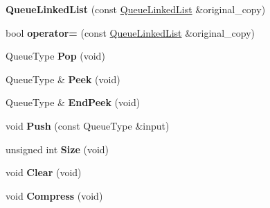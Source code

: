 \begin{DoxyCompactItemize}
\item 
\hypertarget{class_data_structures_1_1_queue_linked_list_a7dc481de74ba21884e1d7a724ecf226d}{{\bfseries Queue\-Linked\-List} (const \hyperlink{class_data_structures_1_1_queue_linked_list}{Queue\-Linked\-List} \&original\-\_\-copy)}\label{class_data_structures_1_1_queue_linked_list_a7dc481de74ba21884e1d7a724ecf226d}

\item 
\hypertarget{class_data_structures_1_1_queue_linked_list_a27766d956d3b153763e66d2db6898d92}{bool {\bfseries operator=} (const \hyperlink{class_data_structures_1_1_queue_linked_list}{Queue\-Linked\-List} \&original\-\_\-copy)}\label{class_data_structures_1_1_queue_linked_list_a27766d956d3b153763e66d2db6898d92}

\item 
\hypertarget{class_data_structures_1_1_queue_linked_list_a05fc69bc1b49a61ec0c951a345aa41a5}{Queue\-Type {\bfseries Pop} (void)}\label{class_data_structures_1_1_queue_linked_list_a05fc69bc1b49a61ec0c951a345aa41a5}

\item 
\hypertarget{class_data_structures_1_1_queue_linked_list_a62fc0fb8ee556ac58e6c28f3bae7c361}{Queue\-Type \& {\bfseries Peek} (void)}\label{class_data_structures_1_1_queue_linked_list_a62fc0fb8ee556ac58e6c28f3bae7c361}

\item 
\hypertarget{class_data_structures_1_1_queue_linked_list_a066645e330dd7291067f2992206b6f68}{Queue\-Type \& {\bfseries End\-Peek} (void)}\label{class_data_structures_1_1_queue_linked_list_a066645e330dd7291067f2992206b6f68}

\item 
\hypertarget{class_data_structures_1_1_queue_linked_list_a241c60f0e573fbc64540de9cda52a8f0}{void {\bfseries Push} (const Queue\-Type \&input)}\label{class_data_structures_1_1_queue_linked_list_a241c60f0e573fbc64540de9cda52a8f0}

\item 
\hypertarget{class_data_structures_1_1_queue_linked_list_aec526a5e119d48da14bacbda3d8985e8}{unsigned int {\bfseries Size} (void)}\label{class_data_structures_1_1_queue_linked_list_aec526a5e119d48da14bacbda3d8985e8}

\item 
\hypertarget{class_data_structures_1_1_queue_linked_list_a916b56766506ebc43ffa7a01d1ccc22b}{void {\bfseries Clear} (void)}\label{class_data_structures_1_1_queue_linked_list_a916b56766506ebc43ffa7a01d1ccc22b}

\item 
\hypertarget{class_data_structures_1_1_queue_linked_list_a876ca8e974a5d0b85c15237391eb670e}{void {\bfseries Compress} (void)}\label{class_data_structures_1_1_queue_linked_list_a876ca8e974a5d0b85c15237391eb670e}

\end{DoxyCompactItemize}


